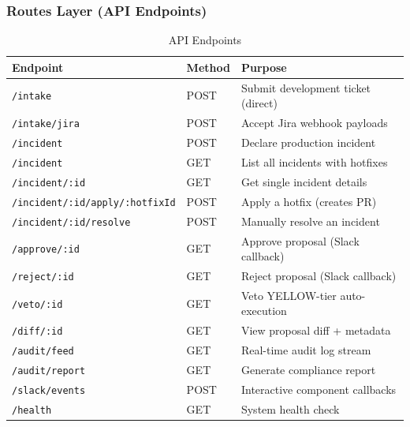 \documentclass[11pt,a4paper]{article}
\begin{document}
\subsubsection{Routes Layer (API Endpoints)}
\begin{table}[h!]
\centering
\begin{tabular}{@{}lll@{}}
\toprule
\textbf{Endpoint} & \textbf{Method} & \textbf{Purpose} \\
\midrule
\texttt{/intake} & POST & Submit development ticket (direct) \\
\texttt{/intake/jira} & POST & Accept Jira webhook payloads \\
\texttt{/incident} & POST & Declare production incident \\
\texttt{/incident} & GET & List all incidents with hotfixes \\
\texttt{/incident/:id} & GET & Get single incident details \\
\texttt{/incident/:id/apply/:hotfixId} & POST & Apply a hotfix (creates PR) \\
\texttt{/incident/:id/resolve} & POST & Manually resolve an incident \\
\texttt{/approve/:id} & GET & Approve proposal (Slack callback) \\
\texttt{/reject/:id} & GET & Reject proposal (Slack callback) \\
\texttt{/veto/:id} & GET & Veto YELLOW-tier auto-execution \\
\texttt{/diff/:id} & GET & View proposal diff + metadata \\
\texttt{/audit/feed} & GET & Real-time audit log stream \\
\texttt{/audit/report} & GET & Generate compliance report \\
\texttt{/slack/events} & POST & Interactive component callbacks \\
\texttt{/health} & GET & System health check \\
\bottomrule
\end{tabular}
\caption{API Endpoints}
\end{table}
\end{document}

